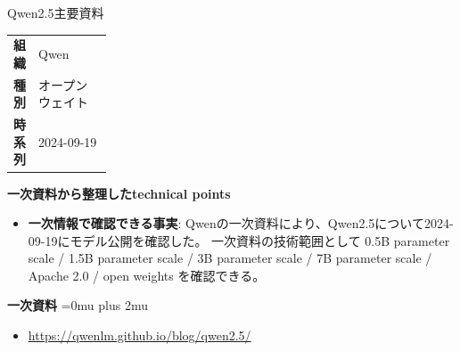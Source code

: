 \begin{technicalnote}{Qwen2.5}{主要資料}
\begingroup
\begin{tabularx}{\linewidth}{@{}>{\bfseries}p{0.22\linewidth}X@{}}
組織 & Qwen \\
種別 & オープンウェイト \\
時系列 & 2024-09-19 \\
\end{tabularx}
\smallskip
{\bfseries 一次資料から整理したtechnical points}
\begin{itemize}[leftmargin=1.5em,itemsep=0.35em]
\item \textbf{一次情報で確認できる事実}: Qwenの一次資料により、Qwen2.5について2024-09-19にモデル公開を確認した。 一次資料の技術範囲として 0.5B parameter scale / 1.5B parameter scale / 3B parameter scale / 7B parameter scale / Apache 2.0 / open weights を確認できる。
\end{itemize}
\begin{minipage}{\linewidth}
\begin{samepage}
{\bfseries 一次資料}
\begingroup\sloppy
\Urlmuskip=0mu plus 2mu\relax
\begin{itemize}[leftmargin=1.5em,itemsep=0.25em]
\item {\scriptsize\url{https://qwenlm.github.io/blog/qwen2.5/}}
\end{itemize}
\endgroup
\end{samepage}
\end{minipage}
\endgroup
\end{technicalnote}
\medskip

